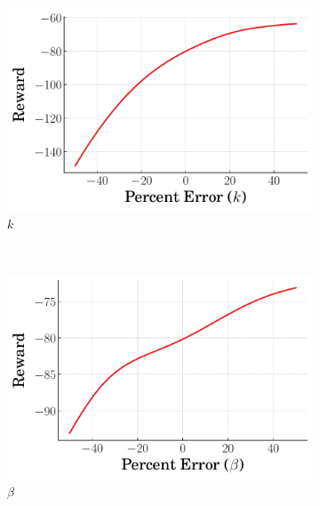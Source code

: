 %
\begin{figure}[t]
    \centering
    \begin{subfigure}[b]{0.49\textwidth}
        \centering
        \includegraphics[width=\textwidth]{figures/figures_robustness/duffing_robustness/k_robustness_fixed_gain.pdf}
        \caption{$k$}
        \label{subfig_chap4:duffing_k_robustness_fixed_gain}
    \end{subfigure}\\
    \hfill
    \begin{subfigure}[b]{0.49\textwidth}
        \centering
        \includegraphics[width=\textwidth]{figures/figures_robustness/duffing_robustness/Beta_robustness_fixed_gain.pdf}
        \caption{$\beta$}
        \label{subfig_chap4:duffing_Beta_robustness_fixed_gain}
    \end{subfigure}
    \hfill
    \begin{subfigure}[b]{0.49\textwidth}

\end{subfigure}
\end{figure}
